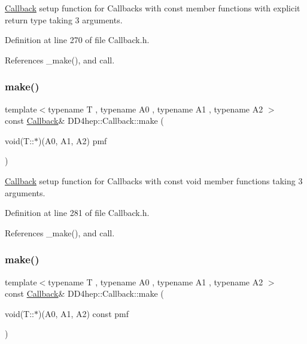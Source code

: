 \hyperlink{class_d_d4hep_1_1_callback}{Callback} setup function for Callbacks with const member functions with explicit return type taking 3 arguments. 



Definition at line 270 of file Callback.\+h.



References \+\_\+make(), and call.

\hypertarget{class_d_d4hep_1_1_callback_ac489654b2fe6f003cec7d7868d90e7dc}{}\label{class_d_d4hep_1_1_callback_ac489654b2fe6f003cec7d7868d90e7dc} 
\subsubsection{\texorpdfstring{make()}{make()}\hspace{0.1cm}{\footnotesize\ttfamily [15/17]}}
{\footnotesize\ttfamily template$<$typename T , typename A0 , typename A1 , typename A2 $>$ \\
const \hyperlink{class_d_d4hep_1_1_callback}{Callback}\& D\+D4hep\+::\+Callback\+::make (\begin{DoxyParamCaption}\item[{void(T\+::$\ast$)(A0, A1, A2)}]{pmf }\end{DoxyParamCaption})\hspace{0.3cm}{\ttfamily [inline]}}



\hyperlink{class_d_d4hep_1_1_callback}{Callback} setup function for Callbacks with const void member functions taking 3 arguments. 



Definition at line 281 of file Callback.\+h.



References \+\_\+make(), and call.

\hypertarget{class_d_d4hep_1_1_callback_a404f91534a506ce6b7305f86d7bd8663}{}\label{class_d_d4hep_1_1_callback_a404f91534a506ce6b7305f86d7bd8663} 
\subsubsection{\texorpdfstring{make()}{make()}\hspace{0.1cm}{\footnotesize\ttfamily [16/17]}}
{\footnotesize\ttfamily template$<$typename T , typename A0 , typename A1 , typename A2 $>$ \\
const \hyperlink{class_d_d4hep_1_1_callback}{Callback}\& D\+D4hep\+::\+Callback\+::make (\begin{DoxyParamCaption}\item[{void(T\+::$\ast$)(A0, A1, A2) const}]{pmf }\end{DoxyParamCaption})\hspace{0.3cm}{\ttfamily [inline]}}




